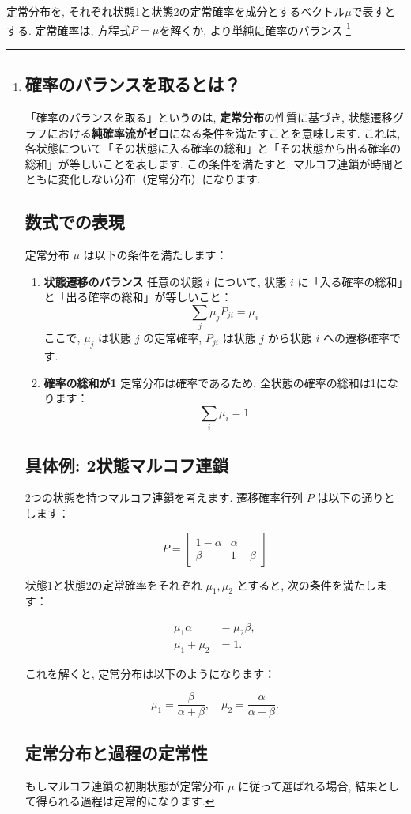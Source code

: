 \documentclass[a4j]{jsarticle}
\begin{document}
定常分布を, それぞれ状態1と状態2の定常確率を成分とするベクトル$\mu$で表すとする. 定常確率は, 方程式$P = \mu$を解くか, より単純に確率のバランス
\footnote{
	\subsection*{確率のバランスを取るとは？}

	「確率のバランスを取る」というのは, \textbf{定常分布}の性質に基づき, 状態遷移グラフにおける\textbf{純確率流がゼロ}になる条件を満たすことを意味します.
	これは, 各状態について「その状態に入る確率の総和」と「その状態から出る確率の総和」が等しいことを表します. この条件を満たすと, マルコフ連鎖が時間とともに変化しない分布（定常分布）になります.

	\subsection*{数式での表現}

	定常分布 $\mu$ は以下の条件を満たします：

	\begin{enumerate}
		\item \textbf{状態遷移のバランス}
		      任意の状態 $i$ について, 状態 $i$ に「入る確率の総和」と「出る確率の総和」が等しいこと：
		      \[
			      \sum_{j} \mu_j P_{ji} = \mu_i
		      \]
		      ここで, $\mu_j$ は状態 $j$ の定常確率, $P_{ji}$ は状態 $j$ から状態 $i$ への遷移確率です.

		\item \textbf{確率の総和が1}
		      定常分布は確率であるため, 全状態の確率の総和は1になります：
		      \[
			      \sum_{i} \mu_i = 1
		      \]
	\end{enumerate}

	\subsection*{具体例: 2状態マルコフ連鎖}
	2つの状態を持つマルコフ連鎖を考えます. 遷移確率行列 $P$ は以下の通りとします：

	\[
		P =
		\begin{bmatrix}
			1-\alpha & \alpha  \\
			\beta    & 1-\beta
		\end{bmatrix}
	\]

	状態1と状態2の定常確率をそれぞれ $\mu_1, \mu_2$ とすると, 次の条件を満たします：

	\begin{align}
		\mu_1 \alpha  & = \mu_2 \beta, \tag{1} \\
		\mu_1 + \mu_2 & = 1. \tag{2}
	\end{align}

	これを解くと, 定常分布は以下のようになります：

	\[
		\mu_1 = \frac{\beta}{\alpha + \beta}, \quad \mu_2 = \frac{\alpha}{\alpha + \beta}.
	\]

	\subsection*{定常分布と過程の定常性}
	もしマルコフ連鎖の初期状態が定常分布 $\mu$ に従って選ばれる場合, 結果として得られる過程は定常的になります.
}
\end{document}
